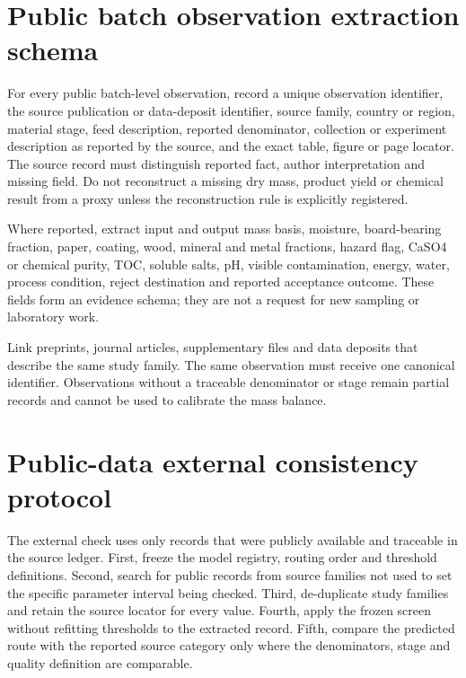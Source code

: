 \documentclass[pdflatex,sn-basic]{sn-jnl}
\begin{document}
\begin{appendices}

\section{Public batch observation extraction schema}\label{appendix-a.-public-batch-observation-extraction-schema}

For every public batch-level observation, record a unique observation identifier, the source publication or data-deposit identifier, source family, country or region, material stage, feed description, reported denominator, collection or experiment description as reported by the source, and the exact table, figure or page locator. The source record must distinguish reported fact, author interpretation and missing field. Do not reconstruct a missing dry mass, product yield or chemical result from a proxy unless the reconstruction rule is explicitly registered.

Where reported, extract input and output mass basis, moisture, board-bearing fraction, paper, coating, wood, mineral and metal fractions, hazard flag, CaSO4 or chemical purity, TOC, soluble salts, pH, visible contamination, energy, water, process condition, reject destination and reported acceptance outcome. These fields form an evidence schema; they are not a request for new sampling or laboratory work.

Link preprints, journal articles, supplementary files and data deposits that describe the same study family. The same observation must receive one canonical identifier. Observations without a traceable denominator or stage remain partial records and cannot be used to calibrate the mass balance.

\section{Public-data external consistency protocol}\label{appendix-b.-public-data-external-consistency-protocol}

The external check uses only records that were publicly available and traceable in the source ledger. First, freeze the model registry, routing order and threshold definitions. Second, search for public records from source families not used to set the specific parameter interval being checked. Third, de-duplicate study families and retain the source locator for every value. Fourth, apply the frozen screen without refitting thresholds to the extracted record. Fifth, compare the predicted route with the reported source category only where the denominators, stage and quality definition are comparable.


\end{appendices}
\end{document}
